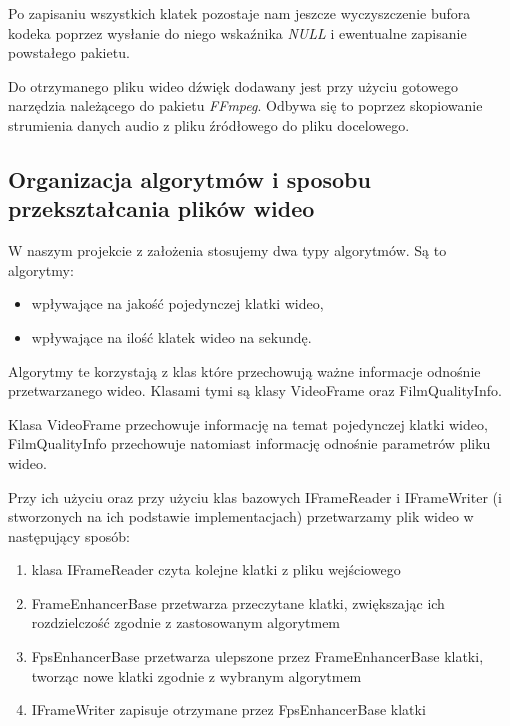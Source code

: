 \documentclass[twoside]{projektInzynierskiMS}
\begin{document}
Po zapisaniu wszystkich klatek pozostaje nam jeszcze wyczyszczenie bufora kodeka poprzez wysłanie do niego wskaźnika \emph{NULL} i ewentualne zapisanie powstałego pakietu.

Do otrzymanego pliku wideo dźwięk dodawany jest przy użyciu gotowego narzędzia należącego do pakietu \emph{FFmpeg}. Odbywa się to poprzez skopiowanie strumienia danych audio z pliku źródłowego do pliku docelowego.


\subsection{Organizacja algorytmów i sposobu przekształcania plików wideo}
W naszym projekcie z założenia stosujemy dwa typy algorytmów. Są to algorytmy:
\begin{itemize}
\item wpływające na jakość pojedynczej klatki wideo,
\item wpływające na ilość klatek wideo na sekundę.
\end{itemize}

Algorytmy te korzystają z klas które przechowują ważne informacje odnośnie przetwarzanego wideo. Klasami tymi są klasy VideoFrame oraz FilmQualityInfo. 

Klasa VideoFrame przechowuje informację na temat pojedynczej klatki wideo, FilmQualityInfo przechowuje natomiast informację odnośnie parametrów pliku wideo. 

Przy ich użyciu oraz przy użyciu klas bazowych IFrameReader i IFrameWriter (i stworzonych na ich podstawie implementacjach) przetwarzamy plik wideo w następujący sposób:
\begin{enumerate}
\item klasa IFrameReader czyta kolejne klatki z pliku wejściowego
\item FrameEnhancerBase przetwarza przeczytane klatki, zwiększając ich rozdzielczość zgodnie z zastosowanym algorytmem
\item FpsEnhancerBase przetwarza ulepszone przez FrameEnhancerBase klatki, tworząc nowe klatki zgodnie z wybranym algorytmem
\item IFrameWriter zapisuje otrzymane przez FpsEnhancerBase klatki
\end{enumerate}
\end{document}
